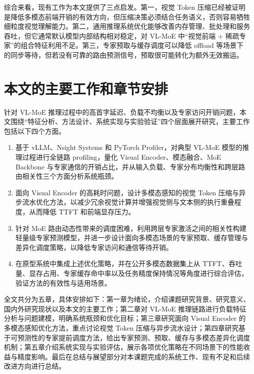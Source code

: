 综合来看，现有工作为本文提供了三点启发。第一，视觉 Token 压缩已经被证明是降低多模态前端开销的有效方向，但压缩决策必须结合任务语义，否则容易牺牲细粒度视觉理解能力。第二，通用推理系统优化能够改善内存管理、批处理和服务吞吐，但它通常默认模型内部结构相对稳定，对 VL-MoE 中“视觉前端 + 稀疏专家”的组合特征利用不足。第三，专家预取与缓存调度可以降低 offload 等场景下的同步等待，但若没有可靠的路由预测信号，预取很可能转化为额外无效搬运。
\section{本文的主要工作和章节安排}
针对 VL-MoE 推理过程中的高首字延迟、负载不均衡以及专家访问开销问题，本文围绕“特征分析、方法设计、系统实现与实验验证”四个层面展开研究，主要工作包括以下四个方面。

\begin{enumerate}
\item 基于 vLLM、Nsight Systems 和 PyTorch Profiler，对典型 VL-MoE 模型的推理过程进行全链路 profiling，量化 Visual Encoder、模态融合、MoE Backbone 与专家通信的开销占比，并从输入负载、专家分布均衡性和跨层路由相关性三个方面分析系统瓶颈。
\item 面向 Visual Encoder 的高耗时问题，设计多模态感知的视觉 Token 压缩与异步流水优化方法，以减少冗余视觉计算并增强视觉侧与文本侧的执行重叠程度，从而降低 TTFT 和前端显存压力。
\item 针对 MoE 路由动态性带来的调度困难，利用跨层专家激活之间的相关性构建轻量级专家预测模型，并进一步设计面向多模态场景的专家预取、缓存管理与差异化调度策略，以降低专家访问和通信等待开销。
\item 在原型系统中集成上述优化策略，并在公开多模态数据集上从 TTFT、吞吐量、显存占用、专家缓存命中率以及任务精度保持情况等角度进行综合评估，验证方法的有效性与适用场景。
\end{enumerate}

全文共分为五章，具体安排如下：第一章为绪论，介绍课题研究背景、研究意义、国内外研究现状以及本文的主要工作；第二章对 VL-MoE 推理链路进行负载特征分析与问题建模，明确系统瓶颈和优化目标；第三章研究面向 Visual Encoder 的多模态感知优化方法，重点讨论视觉 Token 压缩与异步流水设计；第四章研究基于可预测性的专家提前调度方法，给出专家预测、预取、缓存与多模态差异化调度机制；第五章介绍系统实现与实验评估，展示各项优化策略在不同场景下的性能收益与精度影响。最后在总结与展望部分对本课题完成的系统工作、现有不足和后续改进方向进行总结。

